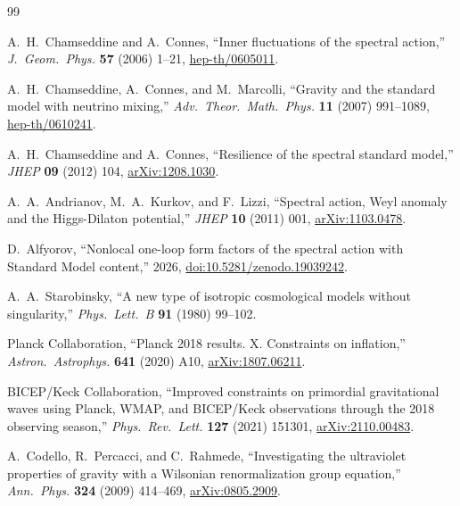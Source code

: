 \documentclass[11pt,a4paper]{article}
\theoremstyle{plain}
\theoremstyle{definition}
\begin{document}
\begin{thebibliography}{99}

A.~H.~Chamseddine and A.~Connes,
``Inner fluctuations of the spectral action,''
\emph{J.\ Geom.\ Phys.} \textbf{57} (2006) 1--21,
\href{https://arxiv.org/abs/hep-th/0605011}{hep-th/0605011}.

A.~H.~Chamseddine, A.~Connes, and M.~Marcolli,
``Gravity and the standard model with neutrino mixing,''
\emph{Adv.\ Theor.\ Math.\ Phys.} \textbf{11} (2007) 991--1089,
\href{https://arxiv.org/abs/hep-th/0610241}{hep-th/0610241}.

A.~H.~Chamseddine and A.~Connes,
``Resilience of the spectral standard model,''
\emph{JHEP} \textbf{09} (2012) 104,
\href{https://arxiv.org/abs/1208.1030}{arXiv:1208.1030}.

A.~A.~Andrianov, M.~A.~Kurkov, and F.~Lizzi,
``Spectral action, Weyl anomaly and the Higgs-Dilaton potential,''
\emph{JHEP} \textbf{10} (2011) 001,
\href{https://arxiv.org/abs/1103.0478}{arXiv:1103.0478}.

D.~Alfyorov,
``Nonlocal one-loop form factors of the spectral action with
Standard Model content,''
2026, \href{https://doi.org/10.5281/zenodo.19039242}%
{doi:10.5281/zenodo.19039242}.

A.~A.~Starobinsky,
``A new type of isotropic cosmological models without singularity,''
\emph{Phys.\ Lett.\ B} \textbf{91} (1980) 99--102.

Planck Collaboration,
``Planck 2018 results. X. Constraints on inflation,''
\emph{Astron.\ Astrophys.} \textbf{641} (2020) A10,
\href{https://arxiv.org/abs/1807.06211}{arXiv:1807.06211}.

BICEP/Keck Collaboration,
``Improved constraints on primordial gravitational waves using Planck,
WMAP, and BICEP/Keck observations through the 2018 observing season,''
\emph{Phys.\ Rev.\ Lett.} \textbf{127} (2021) 151301,
\href{https://arxiv.org/abs/2110.00483}{arXiv:2110.00483}.

A.~Codello, R.~Percacci, and C.~Rahmede,
``Investigating the ultraviolet properties of gravity with a
Wilsonian renormalization group equation,''
\emph{Ann.\ Phys.} \textbf{324} (2009) 414--469,
\href{https://arxiv.org/abs/0805.2909}{arXiv:0805.2909}.

\end{thebibliography}
\end{document}
